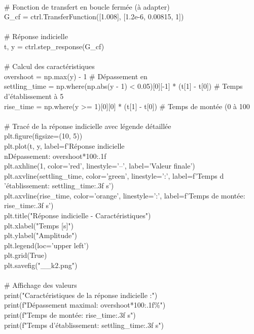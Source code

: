 \documentclass[letterpaper,12pt]{article}
\begin{document}
\\# Fonction de transfert en boucle fermée (à adapter)
\\G\_cf = ctrl.TransferFunction([1.008], [1.2e-6, 0.00815, 1])
\\
\\# Réponse indicielle
\\t, y = ctrl.step\_response(G\_cf)
\\
\\# Calcul des caractéristiques
\\overshoot = np.max(y) - 1  # Dépassement en %
\\settling\_time = np.where(np.abs(y - 1) < 0.05)[0][-1] * (t[1] - t[0])  # Temps d'établissement à 5%
\\rise\_time = np.where(y >= 1)[0][0] * (t[1] - t[0])  # Temps de montée (0 à 100%
\\
\\# Tracé de la réponse indicielle avec légende détaillée
\\plt.figure(figsize=(10, 5))
\\plt.plot(t, y, label=f'Réponse indicielle\\nDépassement: {overshoot*100:.1f}%
\\plt.axhline(1, color='red', linestyle='--', label='Valeur finale')
\\plt.axvline(settling\_time, color='green', linestyle=':', label=f'Temps d\\'établissement: {settling\_time:.3f} s')
\\plt.axvline(rise\_time, color='orange', linestyle=':', label=f'Temps de montée: {rise\_time:.3f} s')
\\plt.title("Réponse indicielle - Caractéristiques")
\\plt.xlabel("Temps [s]")
\\plt.ylabel("Amplitude")
\\plt.legend(loc='upper left')
\\plt.grid(True)
\\plt.savefig("\_\_k2.png")
\\
\\# Affichage des valeurs
\\print("Caractéristiques de la réponse indicielle :")
\\print(f"Dépassement maximal: {overshoot*100:.1f}\%")
\\print(f"Temps de montée: {rise\_time:.3f} s")
\\print(f"Temps d'établissement: {settling\_time:.3f} s")
\end{document}
